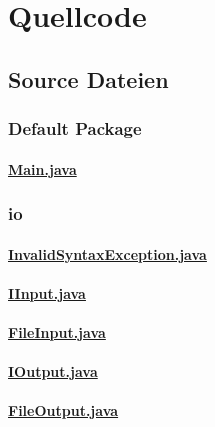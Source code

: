 \chapter{Quellcode}
\label{Quellcode}
\section{Source Dateien}
\subsection{Default Package}
\subsubsection{\underline{Main.java}}

\clearpage
%
\subsection{io}
\subsubsection{\underline{InvalidSyntaxException.java}}

\clearpage
%
\subsubsection{\underline{IInput.java}}

\clearpage
%
\subsubsection{\underline{FileInput.java}}

\clearpage
%
\subsubsection{\underline{IOutput.java}}

\clearpage
%
\subsubsection{\underline{FileOutput.java}}

\clearpage
%
